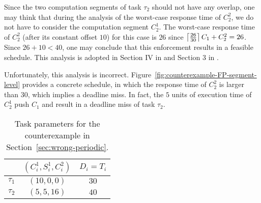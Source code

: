 Since the two computation segments of task $\tau_2$ should not have any overlap, one may think that during the analysis of the worst-case response time of $C_2^2$, we do not have to consider the computation segment $C_2^1$. The worst-case response time of $C_2^2$ (after its constant offset $10$) for this case is $26$ since $\left\lceil{\frac{26}{30}}\right\rceil C_1 + C_2^2 = 26$. 
Since $26+10 < 40$, one may conclude that this enforcement results in a feasible schedule. This analysis is adopted in Section IV in \cite{RTSS-KimANR13} and Section 3 in \cite{DBLP:journals/ieicet/DingTT09}. 

Unfortunately, this analysis is incorrect.
Figure~\ref{fig:counterexample-FP-segment-level} provides a concrete schedule, in which the response time of $C_2^2$ is larger than $30$, which implies a deadline miss. In fact, the $5$ units of execution time of $C_2^1$ push $C_1$ and result in a deadline miss of task $\tau_2$.

\begin{table} [t]
\centering
    \begin{tabular}{|c|c|c|}
 \hline
        & $(C_i^1, S_i^1, C_i^2)$ &  $D_i=T_i$\\ 
        \hline
        $\tau_1$ & $(10, 0, 0)$ &  $30$\\ 
        $\tau_2$ &  $(5, 5, 16)$ & $40$  \\ 
        \hline
    \end{tabular} 
    \caption{Task parameters for the counterexample in Section~\ref{sec:wrong-periodic}.}
    \label{table:ex-periodic}
\end{table}


